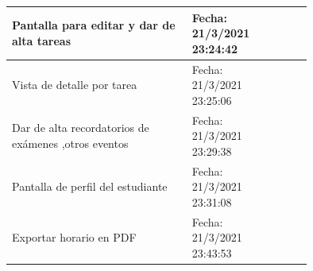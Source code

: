 \documentclass[10pt]{article}
\begin{document}
\begin{table}[H]
\begin{tabular}{|p{0.6\linewidth}|l |p{0.15\linewidth}|}
        {Pantalla para editar y dar de alta tareas}                                                                          & Fecha: 21/3/2021 23:24:42 \\ \hline
        {Vista de detalle por tarea}                                                                                         & Fecha: 21/3/2021 23:25:06 \\ \hline
        {Dar de alta recordatorios de exámenes ,otros eventos}                                                               & Fecha: 21/3/2021 23:29:38 \\ \hline
        {Pantalla de perfil del estudiante}                                                                                  & Fecha: 21/3/2021 23:31:08 \\ \hline
        {Exportar horario en PDF}                                                                                            & Fecha: 21/3/2021 23:43:53 \\ \hline

    \end{tabular}
\end{table}

\newpage
\end{document}
